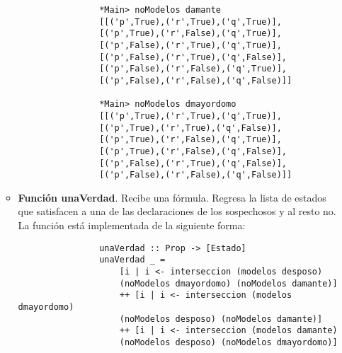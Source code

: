 \documentclass[letterpaper,11pt]{article}
\begin{document}
\begin{itemize}
\begin{itemize}
\begin{lstlisting}
                *Main> noModelos damante
                [[('p',True),('r',True),('q',True)],
                [('p',True),('r',False),('q',True)],
                [('p',False),('r',True),('q',True)],
                [('p',False),('r',True),('q',False)],
                [('p',False),('r',False),('q',True)],
                [('p',False),('r',False),('q',False)]]
                
                *Main> noModelos dmayordomo
                [[('p',True),('r',True),('q',True)],
                [('p',True),('r',True),('q',False)],
                [('p',True),('r',False),('q',True)],
                [('p',True),('r',False),('q',False)],
                [('p',False),('r',True),('q',False)],
                [('p',False),('r',False),('q',False)]]
            \end{lstlisting}

            \item \textbf{Función unaVerdad}. Recibe una fórmula. Regresa la 
            lista de estados que satisfacen a una de las declaraciones de los 
            sospechosos y al resto no. \\
            La función está implementada de la siguiente forma: 
            \begin{lstlisting}
                unaVerdad :: Prop -> [Estado]
                unaVerdad _ = 
                    [i | i <- interseccion (modelos desposo) 
                    (noModelos dmayordomo) (noModelos damante)] 
                    ++ [i | i <- interseccion (modelos dmayordomo) 
                    (noModelos desposo) (noModelos damante)] 
                    ++ [i | i <- interseccion (modelos damante) 
                    (noModelos desposo) (noModelos dmayordomo)]
            \end{lstlisting}


\end{itemize}
\end{itemize}
\end{document}
